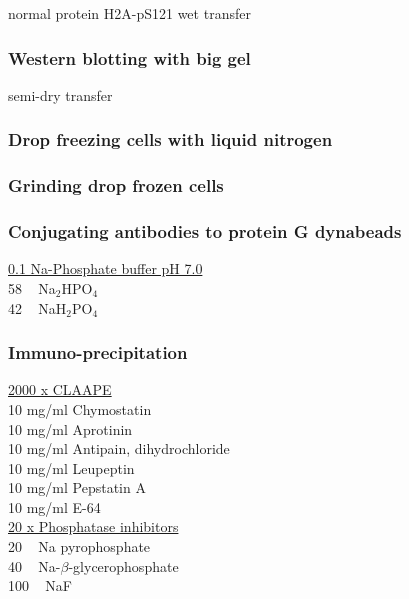 normal protein
H2A-pS121
wet transfer


\subsubsection{Western blotting with big gel}

semi-dry transfer
\subsubsection{Drop freezing cells with liquid nitrogen}
\subsubsection{Grinding drop frozen cells}
\subsubsection{Conjugating antibodies to protein G dynabeads} 

\underline{0.1 \si{\Molar} Na-Phosphate buffer pH 7.0}\\
58 \si{\milli\Molar} Na$_{2}$HPO$_{4}$\\
42 \si{\milli\Molar} NaH$_{2}$PO$_{4}$\\

\subsubsection{Immuno-precipitation}

\underline{2000 x CLAAPE}\\
10 \si{\milli\gram/\milli\litre} Chymostatin \\
10 \si{\milli\gram/\milli\litre} Aprotinin \\
10 \si{\milli\gram/\milli\litre} Antipain, dihydrochloride \\
10 \si{\milli\gram/\milli\litre} Leupeptin \\
10 \si{\milli\gram/\milli\litre} Pepstatin A \\
10 \si{\milli\gram/\milli\litre} E-64  \\

\underline{20 x Phosphatase inhibitors}\\
20 \si{\milli\Molar} Na pyrophosphate\\
40 \si{\milli\Molar} Na-$\beta$-glycerophosphate\\
100 \si{\milli\Molar} NaF\\



